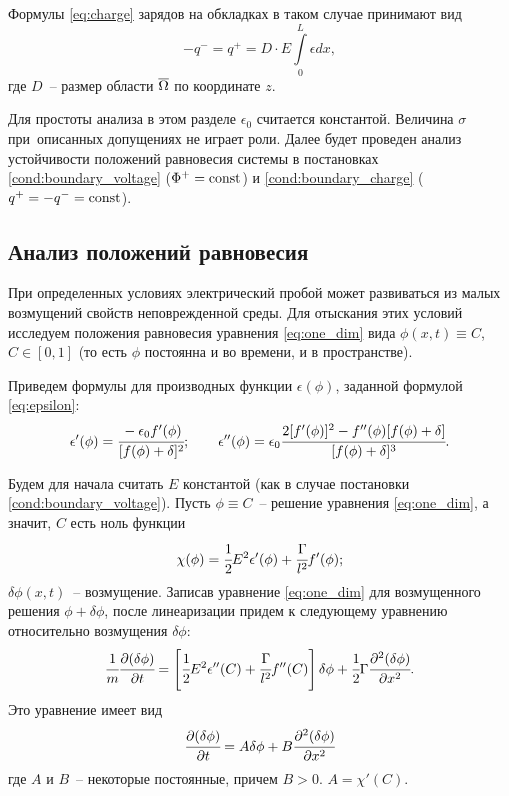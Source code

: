 Формулы \eqref{eq:charge} зарядов на обкладках в таком случае принимают вид
\begin{equation}
    -q^- = q^+ = D \cdot E \int\limits_0^L \epsilon dx,
    \label{eq:one_dim_charge}
\end{equation}
где $D$~-- размер области ${\overline{\Omega}}$ по координате $z$.

Для простоты анализа в этом разделе $\epsilon_0$ считается константой. Величина $\sigma$ при~описанных допущениях не играет роли. Далее будет проведен анализ устойчивости положений равновесия системы в постановках \eqref{cond:boundary_voltage} ($\Phi^+ = \operatorname{{const}}$) и \eqref{cond:boundary_charge} ($q^+ = -q^- \hm = \Const$).


\subsection{Анализ положений равновесия}

При определенных условиях электрический пробой может развиваться из малых возмущений свойств неповрежденной среды. Для отыскания этих условий исследуем положения равновесия уравнения \eqref{eq:one_dim} вида $\phi(x, t) \equiv C$, $C \in [0, 1]$ (то есть $\phi$ постоянна и во времени, и в пространстве).

Приведем формулы для производных функции $\epsilon(\phi)$, заданной формулой \eqref{eq:epsilon}:
\begin{equation}
    \epsilon'(\phi) = \cfrac{-\epsilon_0 f'(\phi)}{[f(\phi) + \delta]^2}; \qquad \epsilon''(\phi) = \epsilon_0 \cfrac{2 [f'(\phi)]^2 - f''(\phi)[f(\phi) + \delta]}{[f(\phi) + \delta]^3}.
    \label{eq:epsilon_derivatives}
\end{equation}

Будем для начала считать $E$ константой (как в случае постановки \eqref{cond:boundary_voltage}). Пусть $\phi \equiv C$~-- решение уравнения \eqref{eq:one_dim}, а значит, $C$ есть ноль функции
\begin{equation}
    \chi(\phi) = \cfrac{1}{2} E^2 \epsilon'(\phi) + \cfrac{\Gamma}{l^2} f'(\phi);
    \label{eq:equilibrium_characteristic}
\end{equation}
$\delta \phi(x, t)$~-- возмущение. Записав уравнение \eqref{eq:one_dim} для возмущенного решения $\phi + \delta \phi$, после линеаризации придем к следующему уравнению относительно возмущения $\delta \phi$:
\begin{equation}
    \cfrac{1}{m} \cfrac{\partial (\delta \phi)}{\partial t} = \left[ \cfrac{1}{2} E^2 \epsilon''(C) + \cfrac{\Gamma}{l^2} f''(C) \right] \delta \phi + \cfrac{1}{2} \Gamma \cfrac{\partial^2 (\delta \phi)}{\partial x^2}.
    \label{tmp:variation}
\end{equation}
Это уравнение имеет вид
\[
    \cfrac{\partial (\delta \phi)}{\partial t} = A \delta \phi + B \cfrac{\partial^2 (\delta \phi)}{\partial x^2}
\]
где $A$ и $B$~-- некоторые постоянные, причем $B > 0$. $A = \chi'(C)$.

